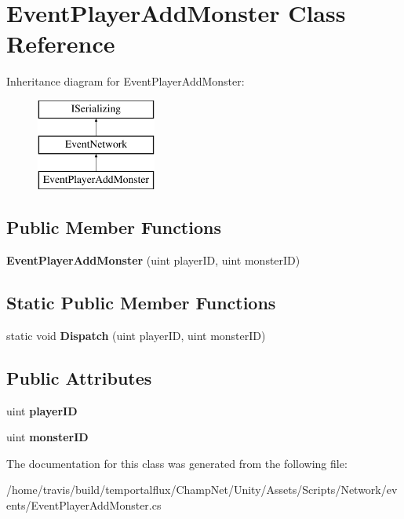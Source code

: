 \hypertarget{class_event_player_add_monster}{\section{Event\-Player\-Add\-Monster Class Reference}
\label{class_event_player_add_monster}
}
Inheritance diagram for Event\-Player\-Add\-Monster\-:\begin{figure}[H]
\begin{center}
\leavevmode
\includegraphics[height=3.000000cm]{class_event_player_add_monster}
\end{center}
\end{figure}
\subsection*{Public Member Functions}
\begin{DoxyCompactItemize}
\item 
\hypertarget{class_event_player_add_monster_a645f8b48f53de87d0346dfd713eecb41}{{\bfseries Event\-Player\-Add\-Monster} (uint player\-I\-D, uint monster\-I\-D)}\label{class_event_player_add_monster_a645f8b48f53de87d0346dfd713eecb41}

\end{DoxyCompactItemize}
\subsection*{Static Public Member Functions}
\begin{DoxyCompactItemize}
\item 
\hypertarget{class_event_player_add_monster_a56c42f47c38537ea4bb992b4dfa010ae}{static void {\bfseries Dispatch} (uint player\-I\-D, uint monster\-I\-D)}\label{class_event_player_add_monster_a56c42f47c38537ea4bb992b4dfa010ae}

\end{DoxyCompactItemize}
\subsection*{Public Attributes}
\begin{DoxyCompactItemize}
\item 
\hypertarget{class_event_player_add_monster_a4beff17ff8417fab909dd0daa4329c4c}{uint {\bfseries player\-I\-D}}\label{class_event_player_add_monster_a4beff17ff8417fab909dd0daa4329c4c}

\item 
\hypertarget{class_event_player_add_monster_ad135e14b529373022b539ed7a900d5c6}{uint {\bfseries monster\-I\-D}}\label{class_event_player_add_monster_ad135e14b529373022b539ed7a900d5c6}

\end{DoxyCompactItemize}


The documentation for this class was generated from the following file\-:\begin{DoxyCompactItemize}
\item 
/home/travis/build/temportalflux/\-Champ\-Net/\-Unity/\-Assets/\-Scripts/\-Network/events/Event\-Player\-Add\-Monster.\-cs\end{DoxyCompactItemize}

